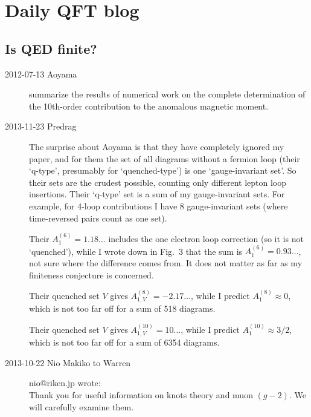 
\chapter{Daily QFT blog}
\label{c-DailyBlog}


\section{Is QED finite?}
\label{sect:finiteQED}

\begin{description}

\item[2012-07-13 Aoyama] \etal{}
summarize the results of numerical work on the complete determination of
the 10th-order contribution to the anomalous magnetic moment.

\item[2013-11-23  Predrag] The surprise about Aoyama \etal{}
is that they have completely ignored my paper, and for
them the set of all diagrams without a fermion loop (their `q-type',
presumably for `quenched-type') is one `gauge-invariant set'. So their sets
are the crudest possible, counting only different lepton loop insertions.
Their `q-type' set is a sum of my gauge-invariant sets. For example, for 4-loop
contributions I have 8 gauge-invariant sets (where time-reversed pairs count as
one set).

Their $A^{(6)}_1 = 1.18\dots $ includes the one electron
loop correction (so it is not `quenched'), while I wrote down in Fig.~3
that the sum is $A^{(6)}_1 = 0.93\dots $, not sure where the difference
comes from. It does not matter as far as my finiteness conjecture is
concerned.

Their quenched set $V$ gives $A^{(8)}_{1,V}= -2.17\dots $, while I
predict $A^{(8)}_1 \approx 0 $, which is not too far off for a sum of 518
diagrams.

Their quenched set $V$ gives $A^{(10)}_{1,V} = 10\dots $, while I
predict $A^{(10)}_1 \approx 3/2 $, which is not too far off for a sum of 6354
diagrams.

\item[2013-10-22 Nio Makiko to Warren]  nio@riken.jp  wrote:\\
  Thank you for useful information on knots theory and muon $(g-2)$.
 We will carefully examine them.


\end{description}

